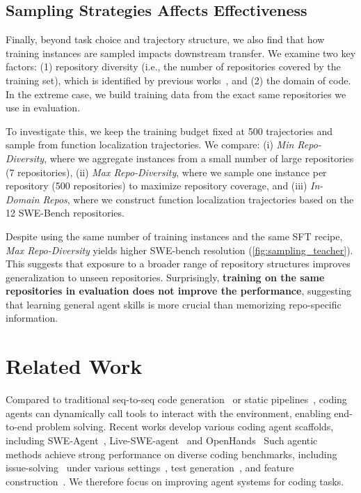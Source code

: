 \documentclass{article}
\theoremstyle{plain}
\theoremstyle{definition}
\theoremstyle{remark}
\begin{document}
\subsection{Sampling Strategies Affects Effectiveness}
Finally, beyond task choice and trajectory structure, we also find that how training instances are sampled impacts downstream transfer. 
We examine two key factors: 
(1) repository diversity (i.e., the number of repositories covered by the training set), which is identified by previous works~\cite{repost,swe-smith}, and 
(2) the domain of code. In the extreme case, we build training data from the exact same repositories we use in evaluation.

To investigate this, we keep the training budget fixed at 500 trajectories and sample from function localization trajectories. We compare:
(i) \emph{Min Repo-Diversity}, where we aggregate instances from a small number of large repositories (7 repositories), 
(ii) \emph{Max Repo-Diversity}, where we sample one instance per repository (500 repositories) to maximize repository coverage, and 
(iii) \emph{In-Domain Repos}, where we construct function localization trajectories based on the 12 SWE-Bench repositories.

Despite using the same number of training instances and the same SFT recipe, \emph{Max Repo-Diversity} yields higher SWE-bench resolution (\autoref{fig:sampling_teacher}). 
This suggests that exposure to a broader range of repository structures improves generalization to unseen repositories.
Surprisingly, \textbf{training on the same repositories in evaluation does not improve the performance}, suggesting that learning general agent skills is more crucial than memorizing repo-specific information.




\section{Related Work}
Compared to traditional seq-to-seq code generation~\cite{codex} or static pipelines~\cite{agentless,swe-search}, coding agents can dynamically call tools to interact with the environment, enabling end-to-end problem solving.
Recent works develop various coding agent scaffolds, including SWE-Agent~\cite{sweagent}, Live-SWE-agent~\citep{live-swe-agent} and OpenHands~\cite{openhands}
Such agentic methods achieve strong performance on diverse coding benchmarks, including issue-solving~\cite{swebench} under various settings~\citep{swebench,swebench-pro,swebench-multimodal,multi-swe-bench}, test generation~\cite{swt-bench,testgeneval}, and feature construction~\cite{commit0,repocoder,R2E,codebenchgen,kernelbench}.
We therefore focus on improving agent systems for coding tasks.
\end{document}
